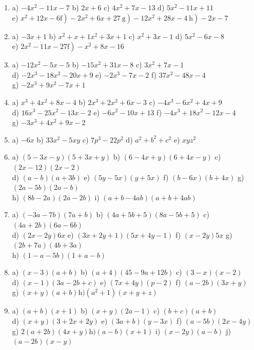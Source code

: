 \documentclass[10pt]{article}
\begin{document}
\begin{enumerate}
  \item a) \(-4 x^{2}-11 x-7\) b) \(2 x+6\) c) \(4 x^{2}+7 x-13\) d) \(5 x^{2}-11 x+11\)\\
e) \(\left.\left.\left.x^{2}+12 x-6 \mathrm{f}\right)-2 x^{2}+6 x+27 \mathrm{~g}\right)-12 x^{2}+28 x-4 \mathrm{~h}\right)-2 x-7\)
  \item a) \(-3 x+1\) b) \(x^{2}+x+1 x^{2}+3 x+1\) c) \(x^{2}+3 x-1\) d) \(5 x^{2}-6 x-8\)\\
e) \(\left.2 x^{2}-11 x-27 \mathrm{f}\right)-x^{2}+8 x-16\)
  \item a) \(-12 x^{2}-5 x-5\) b) \(-15 x^{2}+31 x-8\) c) \(3 x^{2}+7 x-1\)\\
d) \(-2 x^{3}-18 x^{2}-20 x+9\) e) \(-2 x^{3}-7 x-2\) f) \(37 x^{2}-48 x-4\)\\
g) \(-2 x^{3}+9 x^{2}-7 x+1\)
  \item a) \(x^{3}+4 x^{2}+8 x-4\) b) \(2 x^{3}+2 x^{2}+6 x-3\) c) \(-4 x^{3}-6 x^{2}+4 x+9\)\\
d) \(16 x^{3}-25 x^{2}-13 x-2\) e) \(-6 x^{2}-10 x+13\) f) \(-4 x^{3}+18 x^{2}-12 x-4\)\\
g) \(-3 x^{3}+4 x^{2}+9 x-2\)
  \item a) \(-6 x\) b) \(33 x^{2}-5 x y\) c) \(7 p^{3}-22 p^{2}\) d) \(a^{2}+b^{2}+c^{2}\) e) \(x y z^{2}\)
  \item a) \((5-3 x-y)(5+3 x+y)\) b) \((6-4 x+y)(6+4 x-y)\) c) \((2 x-12)(2 x-2)\)\\
d) \((a-b)(a+3 b)\) e) \((5 y-5 x)(y+5 x)\) f) \((b-6 x)(b+4 x)\) g) \((2 a-5 b)(2 a-b)\)\\
h) \((8 b-2 a)(2 a-2 b)\) i) \((a+b-4 a b)(a+b+4 a b)\)
  \item a) \((-3 a-7 b)(7 a+b)\) b) \((4 a+5 b+5)(8 a-5 b+5)\) c) \((4 a+2 b)(6 a-6 b)\)\\
d) \((2 x-2 y) 6 x\) e) \((3 x+2 y+1)(5 x+4 y-1)\) f) \((x-2 y) 5 x\) g) \((2 b+7 a)(4 b+3 a)\)\\
h) \((1-a-5 b)(1+a-b)\)
  \item a) \((x-3)(a+b)\) b) \((a+4)(45-9 a+12 b)\) c) \((3-x)(x-2)\)\\
d) \((x-1)(3 a-2 b+c)\) e) \((7 x+4 y)(p-2)\) f) \((a-2 b)(3 x+y)\)\\
g) \((x+y)(a+b) \mathrm{h})\left(a^{2}+1\right)(x+y+z)\)
  \item a) \((a+b)(x+1)\) b) \((x+y)(2 a-1)\) c) \((b+c)(a+b)\)\\
d) \((x+y)(3+2 x+2 y)\) e) \((3 a+b)(y-3 x)\) f) \((a-5 b)(2 x-4 y)\)\\
g) \(2(a+2 b)(4 x+y) \mathrm{h})(a-b)(x+1)\) i) \((x-2 y)(a-b)\) j) \((a-2 b)(x-y)\)\\

\end{enumerate}
\end{document}
